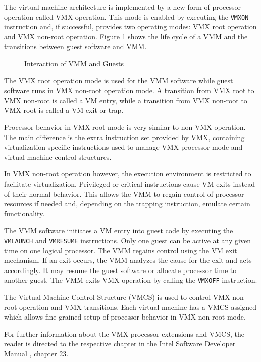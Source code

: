The virtual machine architecture is implemented by a new form of processor
operation called VMX operation. This mode is enabled by executing the
\texttt{VMXON} instruction and, if successful, provides two operating modes:
VMX root operation and VMX non-root operation. Figure \ref{fig:vmm-lifecycle}
shows the life cycle of a VMM and the transitions between guest software and
VMM.

\begin{figure}[h]
	\centering
	
	\caption{Interaction of VMM and Guests}
	\label{fig:vmm-lifecycle}
\end{figure}

The VMX root operation mode is used for the VMM software while guest software
runs in VMX non-root operation mode. A transition from VMX root to VMX non-root
is called a VM entry, while a transition from VMX non-root to VMX root is
called a VM exit or trap.

Processor behavior in VMX root mode is very similar to non-VMX operation.  The
main difference is the extra instruction set provided by VMX, containing
virtualization-specific instructions used to manage VMX processor mode and
virtual machine control structures.

In VMX non-root operation however, the execution environment is restricted to
facilitate virtualization. Privileged or critical instructions cause VM exits
instead of their normal behavior. This allows the VMM to regain control of
processor resources if needed and, depending on the trapping instruction,
emulate certain functionality.

The VMM software initiates a VM entry into guest code by executing the
\texttt{VMLAUNCH} and \texttt{VMRESUME} instructions. Only one guest can be
active at any given time on one logical processor. The VMM regains control
using the VM exit mechanism.  If an exit occurs, the VMM analyzes the cause for
the exit and acts accordingly. It may resume the guest software or allocate
processor time to another guest. The VMM exits VMX operation by calling the
\texttt{VMXOFF} instruction.

The Virtual-Machine Control Structure (VMCS) is used to control VMX
non-root operation and VMX transitions. Each virtual machine has a VMCS
assigned which allows fine-grained setup of processor behavior in VMX non-root
mode.

For further information about the VMX processor extensions and VMCS, the reader
is directed to the respective chapter in the Intel Software Developer
Manual \cite{IntelSDM}, chapter 23.

